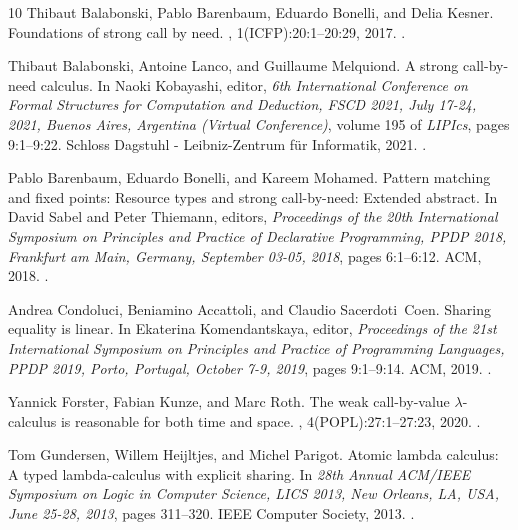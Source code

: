 \documentclass[10pt,a4paper]{article}
\theoremstyle{remark}
\begin{document}
\begin{thebibliography}{10}
Thibaut Balabonski, Pablo Barenbaum, Eduardo Bonelli, and Delia Kesner.
\newblock Foundations of strong call by need.
, 1({ICFP}):20:1--20:29, 2017.
\newblock \href {https://doi.org/10.1145/3110264} {}.

Thibaut Balabonski, Antoine Lanco, and Guillaume Melquiond.
\newblock A strong call-by-need calculus.
\newblock In Naoki Kobayashi, editor, {\em 6th International Conference on
  Formal Structures for Computation and Deduction, {FSCD} 2021, July 17-24,
  2021, Buenos Aires, Argentina (Virtual Conference)}, volume 195 of {\em
  LIPIcs}, pages 9:1--9:22. Schloss Dagstuhl - Leibniz-Zentrum f{\"{u}}r
  Informatik, 2021.
\newblock \href {https://doi.org/10.4230/LIPICS.FSCD.2021.9}
  {}.

Pablo Barenbaum, Eduardo Bonelli, and Kareem Mohamed.
\newblock Pattern matching and fixed points: Resource types and strong
  call-by-need: Extended abstract.
\newblock In David Sabel and Peter Thiemann, editors, {\em Proceedings of the
  20th International Symposium on Principles and Practice of Declarative
  Programming, {PPDP} 2018, Frankfurt am Main, Germany, September 03-05, 2018},
  pages 6:1--6:12. {ACM}, 2018.
\newblock \href {https://doi.org/10.1145/3236950.3236972}
  {}.

Andrea Condoluci, Beniamino Accattoli, and Claudio Sacerdoti~Coen.
\newblock Sharing equality is linear.
\newblock In Ekaterina Komendantskaya, editor, {\em Proceedings of the 21st
  International Symposium on Principles and Practice of Programming Languages,
  { PPDP} 2019, Porto, Portugal, October 7-9, 2019}, pages 9:1--9:14. {ACM},
  2019.
\newblock \href {https://doi.org/10.1145/3354166.3354174}
  {}.

Yannick Forster, Fabian Kunze, and Marc Roth.
\newblock The weak call-by-value {\(\lambda\)}-calculus is reasonable for both
  time and space.
, 4({POPL}):27:1--27:23, 2020.
\newblock \href {https://doi.org/10.1145/3371095} {}.

Tom Gundersen, Willem Heijltjes, and Michel Parigot.
\newblock Atomic lambda calculus: {A} typed lambda-calculus with explicit
  sharing.
\newblock In {\em 28th Annual {ACM/IEEE} Symposium on Logic in Computer
  Science, {LICS} 2013, New Orleans, LA, USA, June 25-28, 2013}, pages
  311--320. {IEEE} Computer Society, 2013.
\newblock \href {https://doi.org/10.1109/LICS.2013.37}
  {}.


\end{thebibliography}
\end{document}
